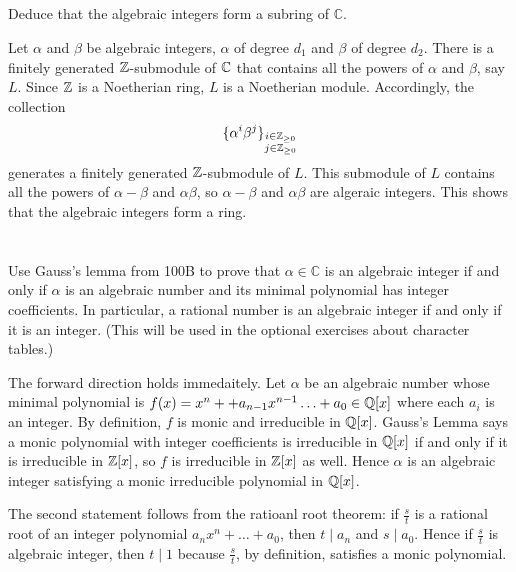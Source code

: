 \documentclass[12pt]{article}
\begin{document}
\subsection{}
Deduce that the algebraic integers form a subring of $\mathbb{C}$.
 
\noindent\dotfill 

Let $\alpha$ and $\beta$ be algebraic integers, $\alpha$ of degree $d_1$ and $\beta$ of degree $d_2$.  
There is a finitely generated $\mathbb{Z}$-submodule of $\mathbb{C}$ that contains all the powers of $\alpha$ and $\beta$, say $L$.  
Since $\mathbb{Z}$ is a Noetherian ring, $L$ is a Noetherian module. 
Accordingly, the collection 
$$\{\alpha^i \beta^j\}_{\substack{i \in \mathbb{Z}_{\geq 0} \\ j \in \mathbb{Z}_{\geq 0}}}$$ 
generates a finitely generated $\mathbb{Z}$-submodule of $L$. 
This submodule of $L$ contains all the powers of $\alpha - \beta$ and $\alpha \beta$, so $\alpha - \beta$ and $\alpha \beta$ are algeraic integers. 
This shows that the algebraic integers form a ring. 


\section{} 
Use Gauss's lemma from 100B to prove that $\alpha \in \mathbb{C}$ is an algebraic integer if and only if $\alpha$ is an algebraic number and its minimal polynomial has integer coefficients. In particular, a rational number is an algebraic integer if and only if it is an integer. (This will be used in the optional exercises about character tables.)
 
\noindent\dotfill 

The forward direction holds immedaitely. 
Let $\alpha$ be an algebraic number whose minimal polynomial is $f(x) = x^n + + a_{n - 1} x^{n - 1} \ldots + a_0 \in \mathbb{Q}[x]$ where each $a_i$ is an integer. 
By definition, $f$ is monic and irreducible in $\mathbb{Q}[x]$. 
Gauss's Lemma says a monic polynomial with integer coefficients is irreducible in $\mathbb{Q}[x]$ if and only if it is irreducible in $\mathbb{Z}[x]$, so $f$ is irreducible in $\mathbb{Z}[x]$ as well. 
Hence $\alpha$ is an algebraic integer satisfying a monic irreducible polynomial in $\mathbb{Q}[x]$. 

The second statement follows from the ratioanl root theorem: 
if $\frac{s}{t}$ is a rational root of an integer polynomial $a_{n}x^{n} + \ldots + a_0$, then $t \mid a_n$ and $s \mid a_0$. 
Hence if $\frac{s}{t}$ is algebraic integer, then $t \mid 1$ because $\frac{s}{t}$, by definition, satisfies a monic polynomial. 
\end{document}
